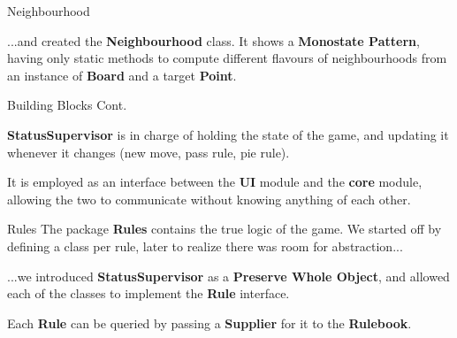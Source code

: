 \documentclass{beamer}
\begin{document}
\begin{frame} {Neighbourhood}

...and created the \textbf{Neighbourhood} class. It shows a \textbf{Monostate Pattern}, having only static methods to compute different flavours of neighbourhoods from an instance of \textbf{Board} and a target \textbf{Point}.

\end{frame}


\begin{frame} {Building Blocks Cont.}

\textbf{StatusSupervisor} is in charge of holding the state of the game, and updating it whenever it changes (new move, pass rule, pie rule).

\vspace{1em}

It is employed as an interface between the \textbf{UI} module and the \textbf{core} module, allowing the two to communicate without knowing anything of each other.

\end{frame}

\begin{frame} {Rules}
The package \textbf{Rules} contains the true logic of the game. We started off by defining a class per rule, later to realize there was room for abstraction...

\vspace{1em}

...we introduced \textbf{StatusSupervisor} as a \textbf{Preserve Whole Object}, and allowed each of the classes to implement the \textbf{Rule} interface.

\vspace{1em}

Each \textbf{Rule} can be queried by passing a \textbf{Supplier} for it to the \textbf{Rulebook}.

\end{frame}
\end{document}
